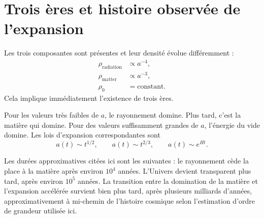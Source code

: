 \begin{classroomqa}\end{classroomqa}

\begin{classroomqa}\end{classroomqa}

\section{Trois ères et histoire observée de l’expansion}

Les trois composantes sont présentes et leur densité évolue différemment :
\begin{equation}
\begin{aligned}
\rho_{\text{radiation}}&\propto a^{-4},\\
\rho_{\text{matter}}&\propto a^{-3},\\
\rho_0&=\text{constant}.
\end{aligned}
\end{equation}
Cela implique immédiatement l’existence de trois ères.

Pour les valeurs très faibles de \(a\), le rayonnement domine. Plus tard, c’est la matière qui domine. Pour des valeurs suffisamment grandes de \(a\), l’énergie du vide domine. Les lois d’expansion correspondantes sont
\begin{equation}
a(t)\sim t^{1/2},
\qquad
a(t)\sim t^{2/3},
\qquad
a(t)\sim e^{Ht}.
\end{equation}

Les durées approximatives citées ici sont les suivantes : le rayonnement cède la place à la matière après environ \(10^4\) années. L’Univers devient transparent plus tard, après environ \(10^5\) années. La transition entre la domination de la matière et l’expansion accélérée survient bien plus tard, après plusieurs milliards d’années, approximativement à mi-chemin de l’histoire cosmique selon l’estimation d’ordre de grandeur utilisée ici.

